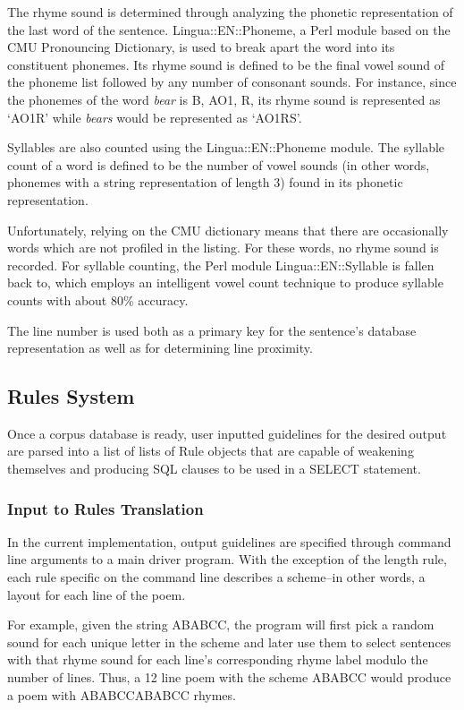 \documentclass[10pt]{article}
\begin{document}
The rhyme sound is determined through analyzing the phonetic representation of
the last word of the sentence. Lingua::EN::Phoneme, a Perl module based on the
CMU Pronouncing Dictionary, is used to break apart the word into its
constituent phonemes. Its rhyme sound is defined to be the final vowel sound of
the phoneme list followed by any number of consonant sounds. For instance,
since the phonemes of the word \emph{bear} is B, AO1, R, its rhyme sound is
represented as `AO1R' while \emph{bears} would be represented as `AO1RS'.

Syllables are also counted using the Lingua::EN::Phoneme module. The syllable
count of a word is defined to be the number of vowel sounds (in other words,
phonemes with a string representation of length 3) found in its phonetic
representation.

Unfortunately, relying on the CMU dictionary means that there are occasionally
words which are not profiled in the listing. For these words, no rhyme sound is
recorded. For syllable counting, the Perl module Lingua::EN::Syllable is fallen
back to, which employs an intelligent vowel count technique to produce syllable
counts with about 80\% accuracy.

The line number is used both as a primary key for the sentence's database
representation as well as for determining line proximity.

\subsection{Rules System}
Once a corpus database is ready, user inputted guidelines for the desired
output are parsed into a list of lists of Rule objects that are capable of
weakening themselves and producing SQL clauses to be used in a SELECT
statement.

\subsubsection{Input to Rules Translation}
In the current implementation, output guidelines are specified through command
line arguments to a main driver program. With the exception of the length rule,
each rule specific on the command line describes a scheme--in other words, a
layout for each line of the poem.

For example, given the string ABABCC, the program will first pick a random
sound for each unique letter in the scheme and later use them to select
sentences with that rhyme sound for each line's corresponding rhyme label
modulo the number of lines. Thus, a 12 line poem with the scheme ABABCC would
produce a poem with ABABCCABABCC rhymes.
\end{document}
